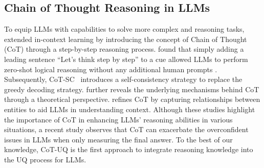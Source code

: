 \subsection{Chain of Thought Reasoning in LLMs}
To equip LLMs with capabilities to solve more complex and reasoning tasks, \citet{wei2022chain} extended in-context learning by introducing the concept of Chain of Thought (CoT) through a step-by-step reasoning process. \citet{kojima2022large} found that simply adding a leading sentence “Let’s think step by step” to a cue allowed LLMs to perform zero-shot logical reasoning without any additional human prompts \citep{chu2023survey}. Subsequently, CoT-SC~\citep{wang2022self} introduces a self-consistency strategy to replace the greedy decoding strategy. \citet{feng2024towards} further reveals the underlying mechanisms behind CoT through a theoretical perspective. \citet{liu2024era} refines CoT by capturing relationships between entities to aid LLMs in understanding context. Although these studies highlight the importance of CoT in enhancing LLMs’ reasoning abilities in various situations, a recent study \citep{fu2025multiple} observes that CoT can exacerbate the overconfident issues in LLMs when only measuring the final answer. To the best of our knowledge, CoT-UQ is the first approach to integrate reasoning knowledge into the UQ process for LLMs.